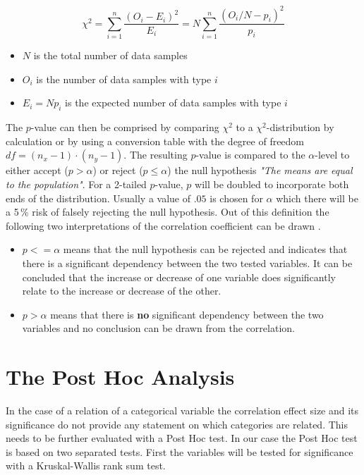 
\begin{equation}
\label{formula_chi_squared_simplified}	
	\chi^2 = \sum_{i=1}^{n}{\frac{(O_i-E_i)^2}{E_i}} = N\sum_{i=1}^{n}{\frac{(O_i/N-p_i)^2}{p_i}}
\end{equation}
\begin{itemize}
	\setlength\itemsep{0.1em}	
	\item[] $N$ is the total number of data samples 
	\item[] $O_i$ is the number of data samples with type $i$
	\item[] $E_i = N p_i$ is the expected number of data samples with type $i$
\end{itemize}

\medskip

The $p$-value can then be comprised by comparing $\chi^2$ to a $\chi^2$-distribution by calculation or by using a conversion table \parencite{Piegorsch2002} with the degree of freedom $df = (n_x - 1) \cdot (n_y - 1)$. The resulting  $p$-value is compared to the $\alpha$-level to either accept ($p > \alpha$) or reject ($p \le \alpha$) the null hypothesis \textit{"The means are equal to the population"}. For a 2-tailed $p$-value, $p$ will be doubled to incorporate both ends of the distribution. Usually a value of $.05$ is chosen for $\alpha$ which there will be a 5\,\% risk of falsely rejecting the null hypothesis. Out of this definition the following two interpretations of the correlation coefficient can be drawn \parencite{Tenny2020,OTSD2020}.

\begin{itemize}
	\item $p <= \alpha$ means that the null hypothesis can be rejected and indicates that there is a significant dependency between the two tested variables. It can be concluded that the increase or decrease of one variable does significantly relate to the increase or decrease of the other.
	\item $p > \alpha$ means that there is \textbf{no} significant dependency between the two variables and no conclusion can be drawn from the correlation.
\end{itemize}

\section{The Post Hoc Analysis}
\label{correlation_posthoc}
In the case of a relation of a categorical variable the correlation effect size and its significance do not provide any statement on which categories are related. This needs to be further evaluated with a Post Hoc test. In our case the Post Hoc test is based on two separated tests. First the variables will be tested for significance with a Kruskal-Wallis rank sum test. 

